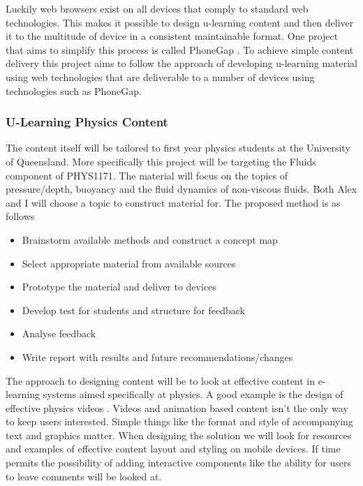 \documentclass[12pt,a4paper]{article}  %
\begin{document}
Luckily web browsers exist on all devices that comply to standard web
technologies. This makes it possible to design u-learning content and
then deliver it to the multitude of device in a consistent
maintainable format. One project that aims to simplify this process is
called PhoneGap \cite{phonegap}. To achieve simple content delivery
this project aims to follow the approach of developing u-learning
material using web technologies that are deliverable to a number of
devices using technologies such as PhoneGap.

\subsubsection*{U-Learning Physics Content}

The content itself will be tailored to first year physics students at
the University of Queensland. More specifically this project will be
targeting the Fluids component of PHYS1171. The material will focus
on the topics of pressure/depth, buoyancy and the fluid dynamics of
non-viscous fluids. Both Alex and I will choose a topic to
construct material for. The proposed method is as follows

\begin{itemize}
  \item Brainstorm available methods and construct a concept map
  \item Select appropriate material from available sources
  \item Prototype the material and deliver to devices
  \item Develop test for students and structure for feedback
  \item Analyse feedback
  \item Write report with results and future recommendations/changes
\end{itemize}

The approach to designing content will be to look at effective content
in e-learning systems aimed specifically at physics. A good example is
the design of effective physics videos \cite{vid}. Videos and
animation based content isn't the only way to keep users interested.
Simple things like the format and style of accompanying text and
graphics matter. When designing the solution we will look for
resources and examples of effective content layout and styling on
mobile devices. If time permits the possibility of adding interactive
components like the ability for users to leave comments will be looked
at.
\end{document}

